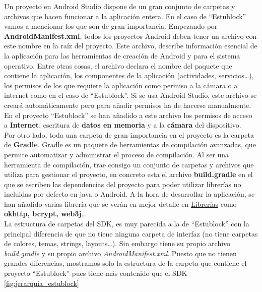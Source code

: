 
Un proyecto en Android Studio dispone de un gran conjunto de carpetas y archivos que hacen funcionar a la aplicación entera. En el caso de ``Estublock'' vamos a mencionar los que son de gran importancia. Empezando por \textbf{AndroidManifest.xml}, todos los proyectos Android deben tener un archivo con este nombre en la raíz del proyecto. Este archivo, describe información esencial de la aplicación para las herramientas de creación de Android y para el sistema operativo. Entre otras cosas, el archivo declara el nombre del paquete que contiene la aplicación, los componentes de la aplicación (actividades, servicios\dots), los permisos de los que requiere la aplicación como permiso a la cámara o a internet como en el caso de ``Estublock''. Si se usa Android Studio, este archivo se creará automáticamente pero para añadir permisos ha de hacerse manualmente. En el proyecto ``Estublock'' se han añadido a este archivo los permisos de acceso a \textbf{Internet}, escritura de \textbf{datos en memoria} y a la \textbf{cámara} del dispositivo. \\

Por otro lado, toda una carpeta de gran importancia en el proyecto es la carpeta de \textbf{Gradle}. Gradle es un paquete de herramientas de compilación avanzadas, que permite automatizar y administrar el proceso de compilación. Al ser una herramienta de compilación, trae consigo un conjunto de carpetas y archivos que utiliza para gestionar el proyecto, en concreto esta el archivo \textbf{build.gradle} en el que se escriben las dependencias del proyecto para poder utilizar librerías no incluidas por defecto en java o Android. A la hora de desarrollar la aplicación, se han añadido varias librería que se verán en mejor detalle en \hyperref[sec:librerias]{Librerías} como \textbf{okhttp, bcrypt, web3j}\dots \\

La estructura de carpetas del SDK, es muy parecida a la de ``Estublock'' con la principal diferencia de que no tiene ninguna carpeta de interfaz (no tiene carpetas de colores, temas, strings, layouts\dots). Sin embargo tiene su propio archivo \emph{build.gradle} y su propio archivo \emph{AndroidManifest.xml}. Puesto que no tienen grandes diferencias, mostramos solo la estructura de la carpeta que contiene el proyecto ``Estublock'' pues tiene más contenido que el SDK \ref{fig:jerarquia_estublock} \\

